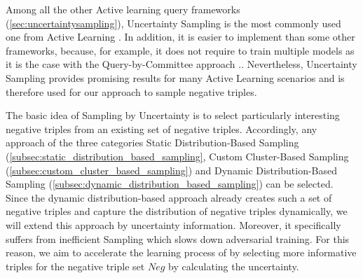 Among all the other Active learning query frameworks (\autoref{sec:uncertaintysampling}), Uncertainty Sampling is the most commonly used one from Active Learning \cite{Settles2009ActiveLL}.
In addition, it is easier to implement than some other frameworks, because, for example, it does not require to train multiple models as it is the case with the Query-by-Committee approach \cite{Settles2009ActiveLL}..
Nevertheless, Uncertainty Sampling provides promising results for many Active Learning scenarios and is therefore used for our approach to sample negative triples.

The basic idea of Sampling by Uncertainty is to select particularly interesting negative triples from an existing set of negative triples.
Accordingly, any approach of the three categories Static Distribution-Based Sampling (\autoref{subsec:static_distribution_based_sampling}, Custom Cluster-Based Sampling (\autoref{subsec:custom_cluster_based_sampling}) and Dynamic Distribution-Based Sampling (\autoref{subsec:dynamic_distribution_based_sampling}) can be selected.
Since the dynamic distribution-based approach \kbgan already creates such a set of negative triples and capture the distribution of negative triples dynamically, we will extend this approach by uncertainty information.
Moreover, it specifically suffers from inefficient Sampling which slows down adversarial training.
For this reason, we aim to accelerate the learning process of \kbgan by selecting more informative triples for the negative triple set $Neg$ by calculating the uncertainty.

